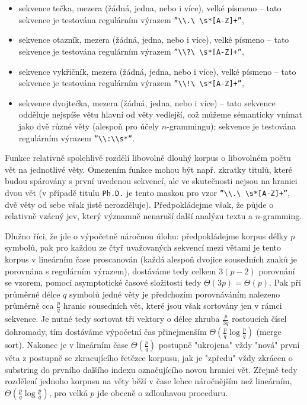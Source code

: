 \begin{itemize}
  \item sekvence tečka, mezera (žádná, jedna, nebo i více), velké písmeno
  -- tato sekvence je testována regulárním výrazem
  \texttt{''\textbackslash \textbackslash .\textbackslash
          \textbackslash s*[A-Z]+''},
  \item sekvence otazník, mezera (žádná, jedna, nebo i více), velké písmeno
  -- tato sekvence je testována regulárním výrazem
  \texttt{''\textbackslash \textbackslash ?\textbackslash
          \textbackslash s*[A-Z]+''},
  \item sekvence vykřičník, mezera (žádná, jedna, nebo i více), velké písmeno
  -- tato sekvence je testována regulárním výrazem
  \texttt{''\textbackslash \textbackslash !\textbackslash
          \textbackslash s*[A-Z]+''},
  \item sekvence dvojtečka, mezera (žádná, jedna, nebo i více)
  -- tato sekvence odděluje nejspíše větu hlavní od věty vedlejší,
  což můžeme sémanticky vnímat jako dvě různé věty (alespoň pro účely
  $n$-grammingu); sekvence je testována regulárním výrazem%
  \texttt{''\textbackslash \textbackslash :\textbackslash \textbackslash s*''}.
\end{itemize}

Funkce relativně spolehlivě rozdělí libovolně dlouhý korpus o libovolném
počtu vět na jednotlivé věty. Omezením funkce mohou být např. zkratky
titulů, které budou spárovány s první uvedenou sekvencí, ale ve skutečnosti
nejsou na hranici dvou vět (v případě titulu \texttt{Ph.D.} je tento maskou
pro vzor \texttt{''\textbackslash \textbackslash .\textbackslash
\textbackslash s*[A-Z]+''}, dvě věty od sebe však jistě nerozděluje).
Předpokládejme však, že půjde o relativně vzácný jev, který významně nenaruší
další analýzu textu a $n$-gramming.

Dlužno říci, že jde o výpočetně náročnou úlohu: předpokládejme korpus délky
$p$ symbolů, pak pro každou ze čtyř uvažovaných sekvencí mezi větami je tento
korpus v lineárním čase proscanován
(každá alespoň dvojice sousedních znaků je
porovnána s regulárním výrazem), dostáváme tedy celkem $3(p-2)$ porovnání
se vzorem, pomocí asymptotické časové složitosti tedy
$\Theta(3p) = \Theta(p)$. Pak při průměrné délce $q$ symbolů jedné věty je
předchozím porovnáváním nalezeno průměrně cca $\frac{p}{q}$ hranic sousedních
vět, které jsou však sortovány jen v rámci sekvence. Je nutné tedy sortovat
tři vektory o délce zhruba $\frac{p}{3q}$ rostoucích čísel dohromady,
tím dostáváme výpočetní čas přinejmenším $\Theta(\frac{p}{q} \log \frac{p}{q})$
(merge sort). Nakonec je v lineárním čase $\Theta(\frac{p}{q})$ postupně
"ukrojena" vždy "nová" první věta z postupně se zkracujícího řetězce korpusu,
jak je "zpředu" vždy zkrácen o substring do prvního dalšího indexu označujícího
novou hranici vět. Zřejmě tedy rozdělení jednoho korpusu na věty běží v čase
lehce náročnějším než lineárním,
$\Theta(\frac{p}{q} \log \frac{p}{q})$, pro
velká $p$ jde obecně o zdlouhavou proceduru.


